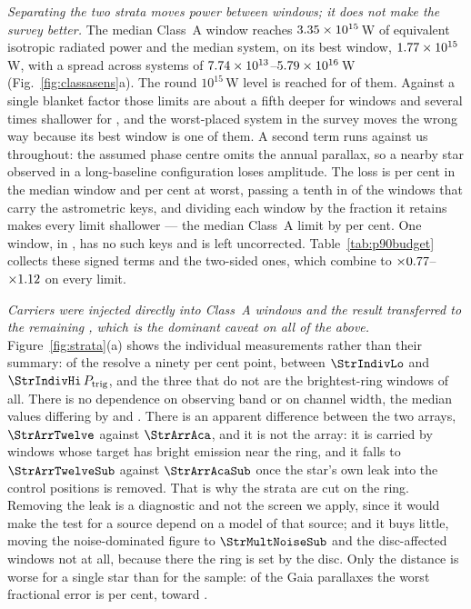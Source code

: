 \emph{Separating the two strata moves power between windows; it does not
make the survey better.} The median Class~A window reaches
$3.35\times10^{15}$\,W of equivalent isotropic radiated power and the median
system, on its best window, $1.77\times10^{15}$\,W, with a spread across
systems of $7.74\times10^{13}$--$5.79\times10^{16}$\,W
(Fig.~\ref{fig:classasens}a). The round $10^{15}$\,W level is reached for
\NSysEfifteen{} of them. Against a single blanket factor those limits are about a fifth
deeper for \StrNNoiseWin{} windows and several times shallower for
\StrNDiscWin, and the worst-placed system in the survey moves the wrong way
because its best window is one of them. A second term runs against us
throughout: the assumed phase centre omits the annual parallax, so a nearby
star observed in a long-baseline configuration loses amplitude. The loss is
\PxaLossMedPct{} per cent in the median window and \PxaLossMaxPct{} per cent
at worst, passing a tenth in \PxaNGtTen{} of the \PxaNWin{} windows that
carry the astrometric keys, and dividing each window by the fraction it
retains makes every limit shallower --- the median Class~A limit by
\PxaShiftWinPct{} per cent. One window, \PxaMissingStar{} in \PxaMissingEb,
has no such keys and is left uncorrected.
Table~\ref{tab:p90budget} collects these signed terms and the two-sided ones,
which combine to $\times0.77$--$\times1.12$ on every
limit.

\emph{Carriers were injected directly into \BudTransN{} Class~A windows and
the result transferred to the remaining \BudTransNTransferred, which is the
dominant caveat on all of the above.} Figure~\ref{fig:strata}(a) shows the
individual measurements rather than their summary: \StrNIndiv{} of the
\StrNInjWin{} resolve a ninety per cent point, between $\StrIndivLo$ and
$\StrIndivHi\,P_{\rm trig}$, and the three that do not are the
brightest-ring windows of all. There is no dependence on observing band or
on channel width, the median values differing by \StrBandSpread{} and
\StrChanSpread. There is an apparent difference between the two arrays,
$\StrArrTwelve$ against $\StrArrAca$, and it is not the array: it is carried
by \StrNArrDriver{} windows whose target has bright emission near the ring,
and it falls to $\StrArrTwelveSub$ against $\StrArrAcaSub$ once the star's
own leak into the control positions is removed. That is why the strata are
cut on the ring. Removing the leak is a diagnostic and not the screen we
apply, since it would make the test for a source depend on a model of that
source; and it buys little, moving the noise-dominated figure to
$\StrMultNoiseSub$ and the disc-affected windows not at all, because there
the ring is set by the disc. Only the distance is worse for a single star than for
the sample: of the \BudPlxNStar{} Gaia parallaxes the worst fractional error
is \SfPlxWorstPct{} per cent, toward \SfPlxWorstStar.

